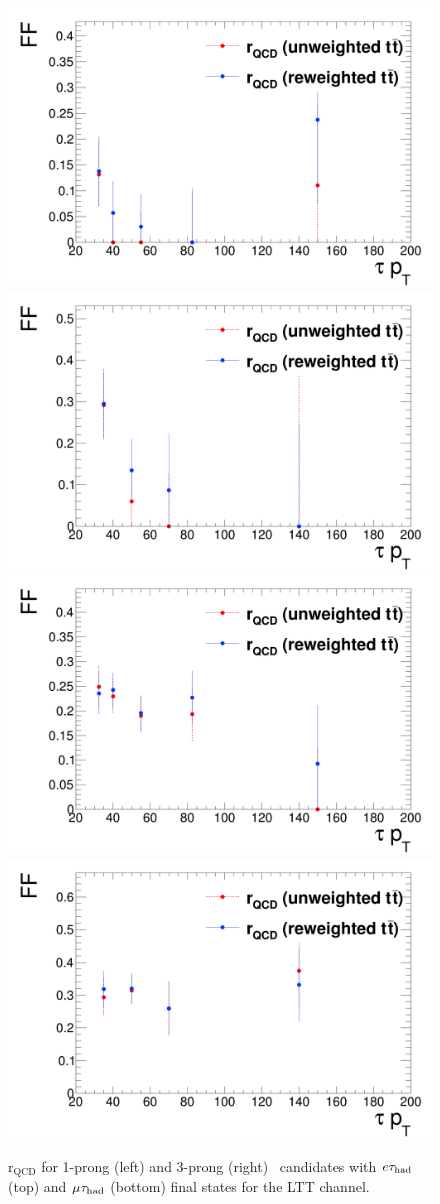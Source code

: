 \begin{figure}[htbp]
\centering
\includegraphics[width=.4\textwidth]{DiHiggs/plots/FF_CRs/LTTElecrQCD1p.png}
\includegraphics[width=.4\textwidth]{DiHiggs/plots/FF_CRs/LTTElecrQCD3p.png} \\
\includegraphics[width=.4\textwidth]{DiHiggs/plots/FF_CRs/LTTMuonrQCD1p.png}
\includegraphics[width=.4\textwidth]{DiHiggs/plots/FF_CRs/LTTMuonrQCD3p.png}\\
\caption{$\mathrm{r}_{\mathrm{QCD}}$ for 1-prong (left) 
and 3-prong (right) \tauhad\ candidates with $e\tau_{\mathrm{had}}$ 
 (top) and $\mu\tau_{\mathrm{had}}$ (bottom) final states
for the LTT channel.}
\label{fig:LTT_rQCD}
\end{figure}
